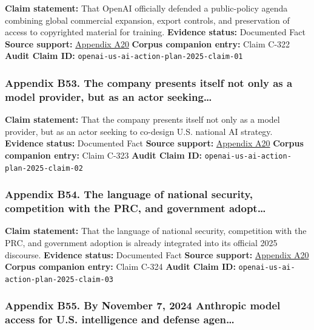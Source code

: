 \documentclass[
  american,
  11pt,
  letterpaper,
]{article}
\begin{document}
\textbf{Claim statement:} That OpenAI officially defended a
public-policy agenda combining global commercial expansion, export
controls, and preservation of access to copyrighted material for
training. \textbf{Evidence status:} Documented Fact \textbf{Source
support:}
\hyperref[ch-08-appendix-a20-openais-proposals-for-the-us-ai-action-plan]{Appendix
A20} \textbf{Corpus companion entry:} Claim C-322 \textbf{Audit Claim
ID:} \texttt{openai-us-ai-action-plan-2025-claim-01}

\subsubsection{Appendix B53. The company presents itself not only as a
model provider, but as an actor
seeking\ldots{}}\label{ch-08-appendix-b53-the-company-presents-itself-not-only-as-a-model-provider-but-as-an-actor-seeking}

\textbf{Claim statement:} That the company presents itself not only as a
model provider, but as an actor seeking to co-design U.S. national AI
strategy. \textbf{Evidence status:} Documented Fact \textbf{Source
support:}
\hyperref[ch-08-appendix-a20-openais-proposals-for-the-us-ai-action-plan]{Appendix
A20} \textbf{Corpus companion entry:} Claim C-323 \textbf{Audit Claim
ID:} \texttt{openai-us-ai-action-plan-2025-claim-02}

\subsubsection{Appendix B54. The language of national security,
competition with the PRC, and government
adopt\ldots{}}\label{ch-08-appendix-b54-the-language-of-national-security-competition-with-the-prc-and-government-adopt}

\textbf{Claim statement:} That the language of national security,
competition with the PRC, and government adoption is already integrated
into its official 2025 discourse. \textbf{Evidence status:} Documented
Fact \textbf{Source support:}
\hyperref[ch-08-appendix-a20-openais-proposals-for-the-us-ai-action-plan]{Appendix
A20} \textbf{Corpus companion entry:} Claim C-324 \textbf{Audit Claim
ID:} \texttt{openai-us-ai-action-plan-2025-claim-03}

\subsubsection{Appendix B55. By November 7, 2024 Anthropic model access
for U.S. intelligence and defense
agen\ldots{}}\label{ch-08-appendix-b55-by-november-7-2024-anthropic-model-access-for-u-s-intelligence-and-defense-agen}
\end{document}
